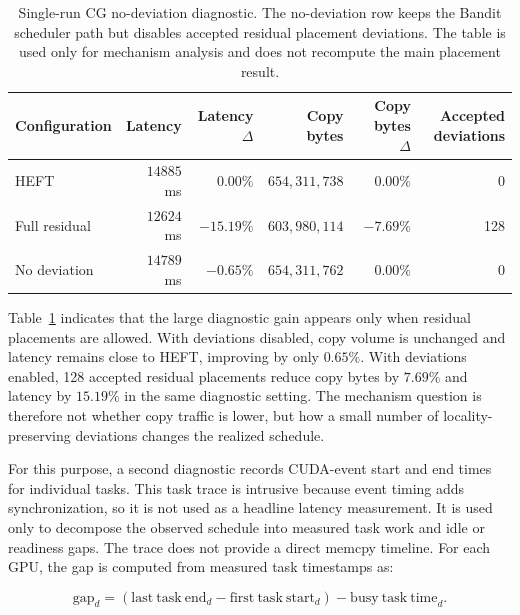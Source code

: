 \begin{table}[!htbp]
\centering
\footnotesize
\setlength{\tabcolsep}{4pt}
\begin{tabular}{@{}lrrrrr@{}}
\toprule
Configuration & Latency & Latency \(\Delta\) & Copy bytes & Copy bytes \(\Delta\) & Accepted deviations \\
\midrule
HEFT & \(14885\) ms & \(0.00\%\) & \(654{,}311{,}738\) & \(0.00\%\) & 0 \\
Full residual & \(12624\) ms & \(-15.19\%\) & \(603{,}980{,}114\) & \(-7.69\%\) & 128 \\
No deviation & \(14789\) ms & \(-0.65\%\) & \(654{,}311{,}762\) & \(0.00\%\) & 0 \\
\bottomrule
\end{tabular}
\caption{Single-run CG no-deviation diagnostic. The no-deviation row keeps the Bandit scheduler path but disables accepted residual placement deviations. The table is used only for mechanism analysis and does not recompute the main placement result.}
\label{tab:results-cg-mechanism}
\end{table}

Table~\ref{tab:results-cg-mechanism} indicates that the large diagnostic gain
appears only when residual placements are allowed. With deviations disabled,
copy volume is unchanged and latency remains close to HEFT, improving by only
\(0.65\%\). With deviations enabled, 128 accepted residual placements reduce
copy bytes by \(7.69\%\) and latency by \(15.19\%\) in the same diagnostic
setting. The mechanism question is therefore not whether copy traffic is lower,
but how a small number of locality-preserving deviations changes the realized
schedule.

For this purpose, a second diagnostic records CUDA-event start and end times for
individual tasks. This task trace is intrusive because event timing adds
synchronization, so it is not used as a headline latency measurement. It is used
only to decompose the observed schedule into measured task work and idle or
readiness gaps. The trace does not provide a direct memcpy timeline. For each
GPU, the gap is computed from measured task timestamps as:

\[
  \mathrm{gap}_d
  =
  (\mathrm{last\ task\ end}_d - \mathrm{first\ task\ start}_d)
  -
  \mathrm{busy\ task\ time}_d .
\]

